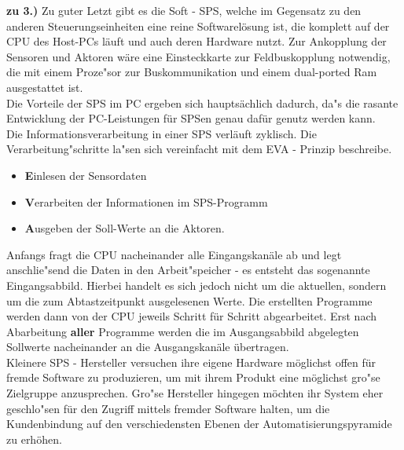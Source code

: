 	\textbf{zu 3.)} Zu guter Letzt gibt es die Soft - SPS, welche im Gegensatz zu den anderen Steuerungseinheiten eine reine Softwarelösung ist, die komplett auf der CPU des Host-PCs läuft und auch deren Hardware nutzt. Zur Ankopplung der Sensoren und Aktoren wäre eine Einsteckkarte zur Feldbuskopplung notwendig, die mit einem Proze"sor zur Buskommunikation und einem dual-ported Ram ausgestattet ist.\\
	
	Die Vorteile der SPS im PC ergeben sich hauptsächlich dadurch, da"s die rasante Entwicklung der PC-Leistungen für SPSen genau dafür genutz werden kann.\\
	
	Die Informationsverarbeitung in einer SPS verläuft zyklisch. Die Verarbeitung"schritte la"sen sich vereinfacht mit dem EVA - Prinzip beschreibe.
	
	\begin{itemize}
		\item \textbf{E}inlesen der Sensordaten
		\item \textbf{V}erarbeiten der Informationen im SPS-Programm
		\item \textbf{A}usgeben der Soll-Werte an die Aktoren.
	\end{itemize}
	
	Anfangs fragt die CPU nacheinander alle Eingangskanäle ab und legt anschlie"send die Daten in den Arbeit"speicher - es entsteht das sogenannte \glqq Eingangsabbild\grqq. Hierbei handelt es sich jedoch nicht um die aktuellen, sondern um die zum Abtastzeitpunkt ausgelesenen Werte. Die erstellten Programme werden dann von der CPU jeweils Schritt für Schritt abgearbeitet. Erst nach Abarbeitung \textbf{aller} Programme werden die im Ausgangsabbild abgelegten Sollwerte nacheinander an die Ausgangskanäle übertragen. \cite{mseitz_sps} \\ 
	
	Kleinere SPS - Hersteller versuchen ihre eigene Hardware möglichst offen für fremde Software zu produzieren, um mit ihrem Produkt eine möglichst gro"se Zielgruppe anzusprechen. Gro"se Hersteller hingegen möchten ihr System eher geschlo"sen für den Zugriff mittels fremder Software halten, um die Kundenbindung auf den verschiedensten Ebenen der Automatisierungspyramide zu erhöhen.
	

